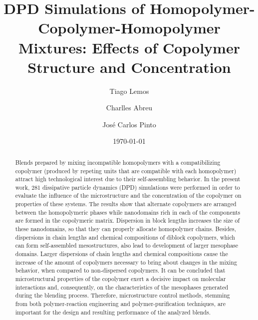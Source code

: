 \documentclass[
aip,
jcp,
reprint,
]{revtex4-1}
\begin{document}
\author{Tiago Lemos}

\author{Charlles Abreu}

\author{Jos\'e Carlos Pinto}

\title{DPD Simulations of Homopolymer-Copolymer-Homopolymer Mixtures: Effects of Copolymer Structure and Concentration}


\date{\today}

\begin{abstract}
Blends prepared by mixing incompatible homopolymers with a compatibilizing copolymer (produced by repeting units that are compatible with each homopolymer) attract high technological interest due to their self-assembling behavior.
In the present work, 281 dissipative particle dynamics (DPD) simulations were performed in order to evaluate the influence of the microstructure and the concentration of the copolymer on properties of these systems.
The results show that alternate copolymers are arranged between the homopolymeric phases while nanodomains rich in each of the components are formed in the copolymeric matrix.
Dispersion in block lengths increases the size of these nanodomains, so that they can properly allocate homopolymer chains.
Besides, dispersions in chain lengths and chemical compositions of diblock copolymers, which can form self-assembled mesostructures, also lead to development of larger mesophase domains.
Larger dispersions of chain lengths and chemical compositions cause the increase of the amount of copolymers necessary to bring about changes in the mixing behavior, when compared to non-dispersed copolymers.
It can be concluded that microstructural properties of the copolymer exert a decisive impact on molecular interactions and, consequently, on the characteristics of the mesophases generated during the blending process.
Therefore, microstructure control methods, stemming from both polymer-reaction engineering and polymer-purification techniques, are important for the design and resulting performance of the analyzed blends.
\end{abstract}
\end{document}
